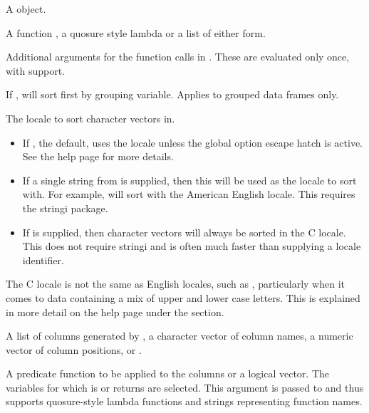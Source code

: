 \documentclass[a4paper]{book}
\begin{document}
\begin{Arguments}
\begin{ldescription}
\item[\code{.tbl}] A  object.

\item[\code{.funs}] A function , a quosure style lambda  or a list of either form.

\item[\code{...}] Additional arguments for the function calls in
. These are evaluated only once, with  support.

\item[\code{.by\_group}] If , will sort first by grouping variable. Applies to
grouped data frames only.

\item[\code{.locale}] The locale to sort character vectors in.
\begin{itemize}

\item{} If , the default, uses the  locale unless the
 global option escape hatch is active. See the
 help page for more details.
\item{} If a single string from  is supplied, then
this will be used as the locale to sort with. For example,  will
sort with the American English locale. This requires the stringi package.
\item{} If  is supplied, then character vectors will always be sorted in the
C locale. This does not require stringi and is often much faster than
supplying a locale identifier.

\end{itemize}


The C locale is not the same as English locales, such as ,
particularly when it comes to data containing a mix of upper and lower case
letters. This is explained in more detail on the 
help page under the  section.

\item[\code{.vars}] A list of columns generated by ,
a character vector of column names, a numeric vector of column
positions, or .

\item[\code{.predicate}] A predicate function to be applied to the columns
or a logical vector. The variables for which  is or
returns  are selected. This argument is passed to
 and thus supports quosure-style lambda
functions and strings representing function names.
\end{ldescription}
\end{Arguments}
\end{document}
